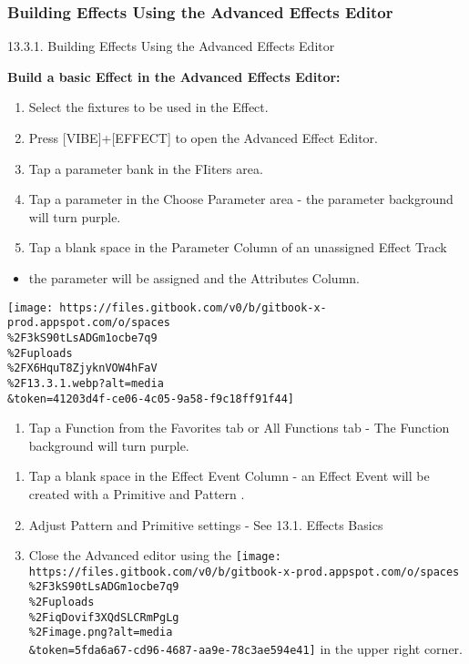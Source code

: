 \documentclass[
]{article}
\providecommand{\tightlist}{%
  \setlength{\itemsep}{0pt}\setlength{\parskip}{0pt}}
\begin{document}
\hypertarget{building-effects-using-the-advanced-effects-editor}{%
\subsubsection{Building Effects Using the Advanced Effects Editor}\label{building-effects-using-the-advanced-effects-editor}}

13.3.1. Building Effects Using the Advanced Effects Editor

\textbf{Build a basic Effect in the Advanced Effects Editor:}

\begin{enumerate}
\def\labelenumi{\arabic{enumi}.}
\item
  Select the fixtures to be used in the Effect.
\item
  Press {[}VIBE{]}+{[}EFFECT{]} to open the Advanced Effect Editor.
\item
  Tap a parameter bank in the FIiters area.
\item
  Tap a parameter in the Choose Parameter area - the parameter background will turn purple.
\item
  Tap a blank space in the Parameter Column of an unassigned Effect Track
\end{enumerate}

\begin{itemize}
\tightlist
\item
  the parameter will be assigned and the Attributes Column.
\end{itemize}

\texttt{[image: https://files.gitbook.com/v0/b/gitbook-x-prod.appspot.com/o/spaces\\\%2F3kS90tLsADGm1ocbe7q9\\\%2Fuploads\\\%2FX6HquT8ZjyknVOW4hFaV\\\%2F13.3.1.webp?alt=media\\\&token=41203d4f-ce06-4c05-9a58-f9c18ff91f44]}

\begin{enumerate}
\def\labelenumi{\arabic{enumi}.}
\setcounter{enumi}{5}
\tightlist
\item
  Tap a Function from the Favorites tab or All Functions tab - The Function background will turn purple.
\end{enumerate}

\begin{enumerate}
\def\labelenumi{\arabic{enumi}.}
\setcounter{enumi}{6}
\item
  Tap a blank space in the Effect Event Column - an Effect Event will be created with a Primitive and Pattern .
\item
  Adjust Pattern and Primitive settings - See 13.1. Effects Basics
\item
  Close the Advanced editor using the \texttt{[image: https://files.gitbook.com/v0/b/gitbook-x-prod.appspot.com/o/spaces\\\%2F3kS90tLsADGm1ocbe7q9\\\%2Fuploads\\\%2FiqDovif3XQdSLCRmPgLg\\\%2Fimage.png?alt=media\\\&token=5fda6a67-cd96-4687-aa9e-78c3ae594e41]} in the upper right corner.
\end{enumerate}
\end{document}
